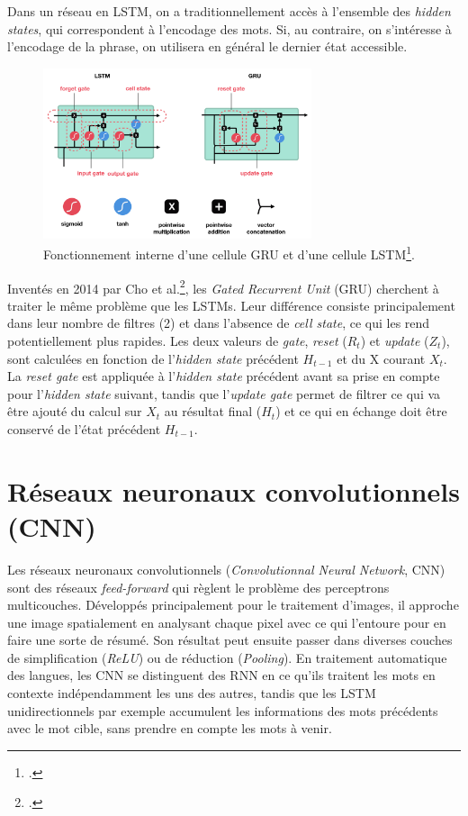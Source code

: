 Dans un réseau en LSTM, on a traditionnellement accès à l'ensemble des \textit{hidden states}, qui correspondent à l'encodage des mots. Si, au contraire, on s'intéresse à l'encodage de la phrase, on utilisera en général le dernier état accessible.

\begin{figure}[h]
    \centering
    \includegraphics[height=5cm]{figures/chap2/GRU LSTM.png}
    \caption{Fonctionnement interne d'une cellule GRU et d'une cellule LSTM\footcite{nguyen_illustrated_2019}.}
    \label{fig:deep-learning:lstm-gru}
\end{figure}


\label{deep-learning:gru}
Inventés en 2014 par Cho et al.\footcite{cho_properties_2014}, les \textit{Gated Recurrent Unit} (GRU) cherchent à traiter le même problème que les LSTMs. Leur différence consiste principalement dans leur nombre de filtres (2) et dans l'absence de \textit{cell state}, ce qui les rend potentiellement plus rapides. Les deux valeurs de \textit{gate}, \textit{reset} ($R_{t}$) et \textit{update} ($Z_{t}$), sont calculées en fonction de l'\textit{hidden state} précédent $H_{t-1}$ et du X courant $X_{t}$. La \textit{reset gate} est appliquée à l'\textit{hidden state} précédent avant sa prise en compte pour l'\textit{hidden state} suivant, tandis que l'\textit{update gate} permet de filtrer ce qui va être ajouté du calcul sur $X_{t}$ au résultat final ($H_{t}$) et ce qui en échange doit être conservé de l'état précédent $H_{t-1}$.


\section{Réseaux neuronaux convolutionnels (CNN)}
\label{deep-learning:CNN}

Les réseaux neuronaux convolutionnels (\textit{Convolutionnal Neural Network}, CNN) sont des réseaux \textit{feed-forward} qui règlent le problème des perceptrons multicouches. Développés principalement pour le traitement d'images, il approche une image spatialement en analysant chaque pixel avec ce qui l'entoure pour en faire une sorte de résumé. Son résultat peut ensuite passer dans diverses couches de simplification (\textit{ReLU}) ou de réduction (\textit{Pooling}). En traitement automatique des langues, les CNN se distinguent des RNN en ce qu'ils traitent les mots en contexte indépendamment les uns des autres, tandis que les LSTM unidirectionnels par exemple accumulent les informations des mots précédents avec le mot cible, sans prendre en compte les mots à venir.

